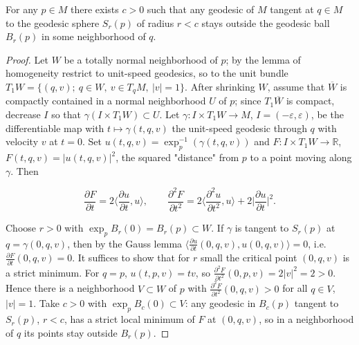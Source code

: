\begin{lemma}
  \label{lem:dc-ch3-4-1}
  \leanok
  For any $p\in M$ there exists $c>0$ such that any geodesic of $M$ tangent at
  $q\in M$ to the geodesic sphere $S_r(p)$ of radius $r<c$ stays outside the
  geodesic ball $B_r(p)$ in some neighborhood of $q$.
\end{lemma}
\begin{proof}
  \sketch
  \leanok
  Let $W$ be a totally normal neighborhood of $p$; by the lemma of
  homogeneity restrict to unit-speed geodesics, so to the unit bundle
  $T_1W=\{(q,v);\ q\in W,\ v\in T_qM,\ |v|=1\}$. After shrinking $W$, assume that
  $\overline{W}$ is compactly contained in a normal neighborhood $U$ of $p$; since
  $T_1\overline{W}$ is compact, decrease $I$ so that
  $\gamma(I\times T_1W)\subset U$. Let
  $\gamma:I\times T_1W\to M$, $I=(-\varepsilon,\varepsilon)$, be the differentiable
  map with $t\mapsto\gamma(t,q,v)$ the unit-speed geodesic through $q$ with velocity
  $v$ at $t=0$. Set $u(t,q,v)=\exp_p^{-1}(\gamma(t,q,v))$ and
  $F:I\times T_1W\to\mathbb{R}$, $F(t,q,v)=|u(t,q,v)|^2$, the squared "distance"
  from $p$ to a point moving along $\gamma$. Then
  
  $$
  \frac{\partial F}{\partial t}=2\Big\langle\frac{\partial u}{\partial t},u\Big\rangle,\qquad\frac{\partial^2 F}{\partial t^2}=2\Big\langle\frac{\partial^2 u}{\partial t^2},u\Big\rangle+2\Big|\frac{\partial u}{\partial t}\Big|^2.
  $$
  
  Choose $r>0$ with $\exp_p B_r(0)=B_r(p)\subset W$. If $\gamma$ is tangent to
  $S_r(p)$ at $q=\gamma(0,q,v)$, then by the Gauss lemma
  $\langle\frac{\partial u}{\partial t}(0,q,v),u(0,q,v)\rangle=0$, i.e.
  $\frac{\partial F}{\partial t}(0,q,v)=0$. It suffices to show that for $r$ small
  the critical point $(0,q,v)$ is a strict minimum. For $q=p$, $u(t,p,v)=tv$, so
  $\frac{\partial^2 F}{\partial t^2}(0,p,v)=2|v|^2=2>0$. Hence there is a
  neighborhood $V\subset W$ of $p$ with $\frac{\partial^2 F}{\partial t^2}(0,q,v)>0$
  for all $q\in V$, $|v|=1$. Take $c>0$ with $\exp_p B_c(0)\subset V$: any geodesic
  in $B_c(p)$ tangent to $S_r(p)$, $r<c$, has a strict local minimum of $F$ at
  $(0,q,v)$, so in a neighborhood of $q$ its points stay outside $B_r(p)$.
\end{proof}

